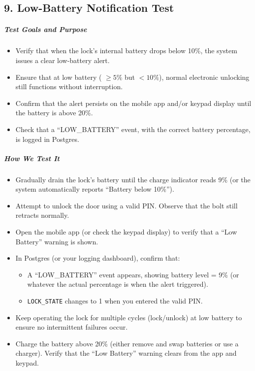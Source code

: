 \newpage
\begin{samepage}
\subsection*{9. Low-Battery Notification Test}

\subparagraph{Test Goals and Purpose}
\begin{itemize}
    \item Verify that when the lock’s internal battery drops below 10\%, the system issues a clear low-battery alert.
    \item Ensure that at low battery ( \(\ge 5\%\) but $<10\%$), normal electronic unlocking still functions without interruption.
    \item Confirm that the alert persists on the mobile app and/or keypad display until the battery is above 20\%.
    \item Check that a “LOW\_BATTERY” event, with the correct battery percentage, is logged in Postgres.
\end{itemize}

\subparagraph{How We Test It}
\begin{itemize}
    \item Gradually drain the lock’s battery until the charge indicator reads 9\% (or the system automatically reports “Battery below 10\%”).
    \item Attempt to unlock the door using a valid PIN. Observe that the bolt still retracts normally.
    \item Open the mobile app (or check the keypad display) to verify that a “Low Battery” warning is shown.
    \item In Postgres (or your logging dashboard), confirm that:
    \begin{itemize}
        \item A “LOW\_BATTERY” event appears, showing battery level = 9\% (or whatever the actual percentage is when the alert triggered).
        \item \texttt{LOCK\_STATE} changes to 1 when you entered the valid PIN.
    \end{itemize}
    \item Keep operating the lock for multiple cycles (lock/unlock) at low battery to ensure no intermittent failures occur.
    \item Charge the battery above 20\% (either remove and swap batteries or use a charger). Verify that the “Low Battery” warning clears from the app and keypad.
\end{itemize}
\end{samepage}


